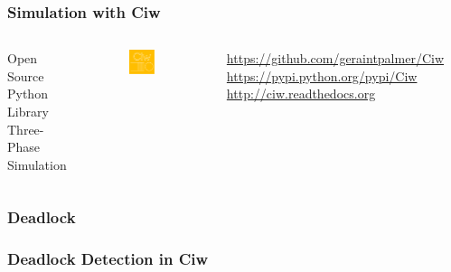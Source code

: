 \documentclass[xcolor={table}]{beamer}
\begin{document}
\begin{frame}
\frametitle{Simulation with Ciw}
\begin{columns}[c]
Open Source Python Library\\
Three-Phase Simulation\\
\begin{figure}
\includegraphics[width=0.6\textwidth]{logo}
\end{figure}

{\tiny
\url{https://github.com/geraintpalmer/Ciw}\\
\url{https://pypi.python.org/pypi/Ciw}\\
\url{http://ciw.readthedocs.org}\\}

\fontsize{8.5pt}{10pt} \inputminted{python}{ciwexample.py}
\end{columns}
\end{frame}


\begin{frame}
    \frametitle{Deadlock}
    \begin{figure}
    
    \end{figure}
\end{frame}

\begin{frame}
    \begin{figure}
    
    \end{figure}
\end{frame}

\begin{frame}
\frametitle{Deadlock Detection in Ciw}
\begin{center}
\fontsize{8.5pt}{10pt} \inputminted{python}{deadlockciw.py}
\end{center}
\end{frame}
\end{document}
